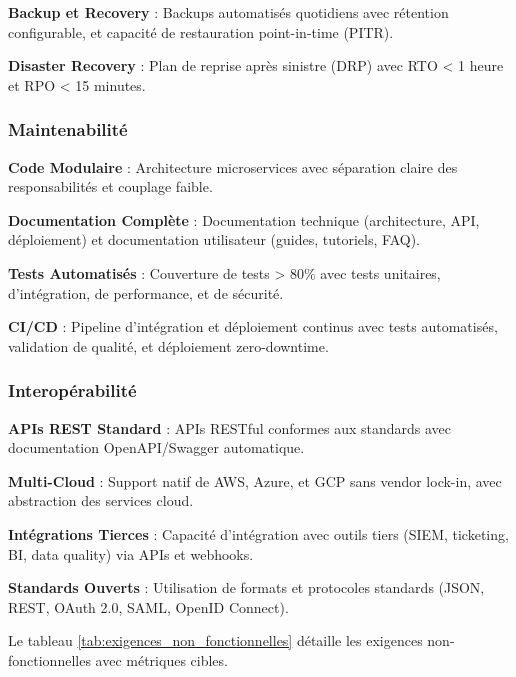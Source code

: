 \textbf{Backup et Recovery} : Backups automatisés quotidiens avec rétention configurable, et capacité de restauration point-in-time (PITR).

\textbf{Disaster Recovery} : Plan de reprise après sinistre (DRP) avec RTO < 1 heure et RPO < 15 minutes.

\subsubsection{Maintenabilité}

\textbf{Code Modulaire} : Architecture microservices avec séparation claire des responsabilités et couplage faible.

\textbf{Documentation Complète} : Documentation technique (architecture, API, déploiement) et documentation utilisateur (guides, tutoriels, FAQ).

\textbf{Tests Automatisés} : Couverture de tests > 80\% avec tests unitaires, d'intégration, de performance, et de sécurité.

\textbf{CI/CD} : Pipeline d'intégration et déploiement continus avec tests automatisés, validation de qualité, et déploiement zero-downtime.

\subsubsection{Interopérabilité}

\textbf{APIs REST Standard} : APIs RESTful conformes aux standards avec documentation OpenAPI/Swagger automatique.

\textbf{Multi-Cloud} : Support natif de AWS, Azure, et GCP sans vendor lock-in, avec abstraction des services cloud.

\textbf{Intégrations Tierces} : Capacité d'intégration avec outils tiers (SIEM, ticketing, BI, data quality) via APIs et webhooks.

\textbf{Standards Ouverts} : Utilisation de formats et protocoles standards (JSON, REST, OAuth 2.0, SAML, OpenID Connect).

Le tableau \ref{tab:exigences_non_fonctionnelles} détaille les exigences non-fonctionnelles avec métriques cibles.

